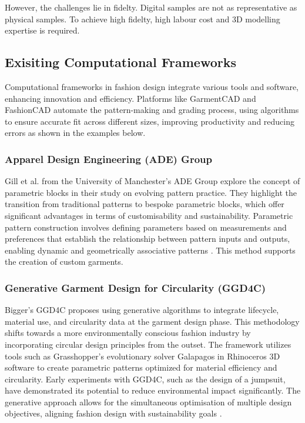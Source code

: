 However, the challenges lie in fidelty. Digital samples are not as representative as physical samples. To achieve high fidelty, high labour cost and 3D modelling expertise is required.

\subsection{Exisiting Computational Frameworks}
Computational frameworks in fashion design integrate various tools and software, enhancing innovation and efficiency. Platforms like GarmentCAD and FashionCAD automate the pattern-making and grading process, using algorithms to ensure accurate fit across different sizes, improving productivity and reducing errors as shown in the examples below.

\subsubsection{Apparel Design Engineering (ADE) Group}
Gill et al. from the University of Manchester's ADE Group explore the concept of parametric blocks in their study on evolving pattern practice. They highlight the transition from traditional patterns to bespoke parametric blocks, which offer significant advantages in terms of customisability and sustainability. Parametric pattern construction involves defining parameters based on measurements and preferences that establish the relationship between pattern inputs and outputs, enabling dynamic and geometrically associative patterns \cite{gill_evolving_2023}. This method supports the creation of custom garments.

\subsubsection{Generative Garment Design for Circularity (GGD4C)}
Bigger's GGD4C proposes using generative algorithms to integrate lifecycle, material use, and circularity data at the garment design phase. This methodology shifts towards a more environmentally conscious fashion industry by incorporating circular design principles from the outset. The framework utilizes tools such as Grasshopper's evolutionary solver Galapagos in Rhinoceros 3D software to create parametric patterns optimized for material efficiency and circularity. Early experiments with GGD4C, such as the design of a jumpsuit, have demonstrated its potential to reduce environmental impact significantly. The generative approach allows for the simultaneous optimisation of multiple design objectives, aligning fashion design with sustainability goals \cite{bigger_generative_2021}.

